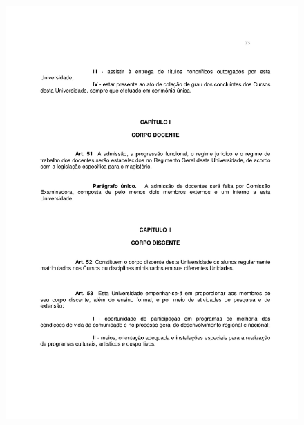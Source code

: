 \begin{figure}[p]
	\centering 
	\includegraphics[scale=0.7]{capitulos/resolucoes/cuni414/cuni414-23.pdf}
\end{figure}

